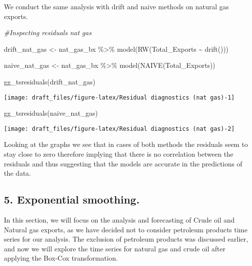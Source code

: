 \documentclass[
]{article}
\newenvironment{Shaded}{\begin{snugshade}}{\end{snugshade}}
\newcommand{\CommentTok}[1]{\textcolor[rgb]{0.56,0.35,0.01}{\textit{#1}}}
\newcommand{\FunctionTok}[1]{\textcolor[rgb]{0.00,0.00,0.00}{#1}}
\newcommand{\NormalTok}[1]{#1}
\newcommand{\OtherTok}[1]{\textcolor[rgb]{0.56,0.35,0.01}{#1}}
\newcommand{\SpecialCharTok}[1]{\textcolor[rgb]{0.00,0.00,0.00}{#1}}
\begin{document}
We conduct the same analysis with drift and naive methods on natural gas
exports.

\begin{Shaded}
\begin{Highlighting}[]
\CommentTok{\#Inspecting residuals nat gas}

\NormalTok{drift\_nat\_gas }\OtherTok{\textless{}{-}}\NormalTok{ nat\_gas\_bx }\SpecialCharTok{\%\textgreater{}\%} 
  \FunctionTok{model}\NormalTok{(}\FunctionTok{RW}\NormalTok{(Total\_Exports }\SpecialCharTok{\textasciitilde{}} \FunctionTok{drift}\NormalTok{()))}

\NormalTok{naive\_nat\_gas }\OtherTok{\textless{}{-}}\NormalTok{ nat\_gas\_bx }\SpecialCharTok{\%\textgreater{}\%} 
  \FunctionTok{model}\NormalTok{(}\FunctionTok{NAIVE}\NormalTok{(Total\_Exports))}

\FunctionTok{gg\_tsresiduals}\NormalTok{(drift\_nat\_gas)}
\end{Highlighting}
\end{Shaded}

\begin{center}\texttt{[image: draft\_files/figure-latex/Residual diagnostics (nat gas)-1]} \end{center}

\begin{Shaded}
\begin{Highlighting}[]
\FunctionTok{gg\_tsresiduals}\NormalTok{(naive\_nat\_gas)}
\end{Highlighting}
\end{Shaded}

\begin{center}\texttt{[image: draft\_files/figure-latex/Residual diagnostics (nat gas)-2]} \end{center}

Looking at the graphs we see that in cases of both methods the residuals
seem to stay close to zero therefore implying that there is no
correlation between the residuals and thus suggesting that the models
are accurate in the predictions of the data.

\hypertarget{exponential-smoothing.}{%
\subsection{5. Exponential smoothing.}\label{exponential-smoothing.}}

In this section, we will focus on the analysis and forecasting of Crude
oil and Natural gas exports, as we have decided not to consider
petroleum products time series for our analysis. The exclusion of
petroleum products was discussed earlier, and now we will explore the
time series for natural gas and crude oil after applying the Box-Cox
transformation.
\end{document}
